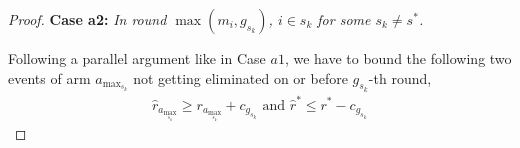 \begin{proof}
\textbf{Case a2:} \textit{In round $\max(m_{i},g_{s_{k}})$, ${i} \in s_k$ for some $s_k \ne s^{*}$.}

%
%
%
%  
%   
% 
% 
%

Following a parallel argument like in Case $a1$, we have to bound the following two events of arm $a_{\max_{s_{k}}}$ not getting eliminated on or before $g_{s_{k}}$-th round,
\begin{align*}
  \hat{r}_{a_{\max_{s_{k}}}} \geq r_{a_{\max_{s_{k}}}} +c_{g_{s_{k}}} \text{ and } \hat{r}^{*} \leq r^{*} -c_{g_{s_{k}}}  
\end{align*} 


\end{proof}
